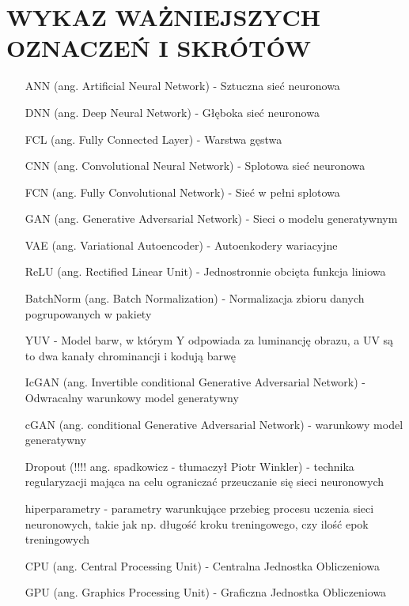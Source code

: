 \section*{WYKAZ WAŻNIEJSZYCH OZNACZEŃ I SKRÓTÓW}

  \bigskip

  \begin{itemize}
    \item[ANN] (ang. Artificial Neural Network) - Sztuczna sieć neuronowa
    \item[DNN] (ang. Deep Neural Network) - Głęboka sieć neuronowa
    \item[FCL] (ang. Fully Connected Layer) - Warstwa gęstwa
    \item[CNN] (ang. Convolutional Neural Network) - Splotowa sieć neuronowa
    \item[FCN] (ang. Fully Convolutional Network) - Sieć w pełni splotowa
    \item[GAN] (ang. Generative Adversarial Network) - Sieci o modelu generatywnym
    \item[VAE] (ang. Variational Autoencoder) - Autoenkodery wariacyjne
    \item[ReLU] (ang. Rectified Linear Unit) - Jednostronnie obcięta funkcja liniowa
    \item[BatchNorm] (ang. Batch Normalization) - Normalizacja zbioru danych
    pogrupowanych w pakiety
    \item[YUV] - Model barw, w którym Y odpowiada za luminancję obrazu, a UV
    są to dwa kanały chrominancji i kodują barwę
    \item[IcGAN] (ang. Invertible conditional Generative Adversarial Network) -
    Odwracalny warunkowy model generatywny
    \item[cGAN] (ang. conditional Generative Adversarial Network) - warunkowy
    model generatywny
    \item[Dropout] (!!!! ang. spadkowicz - tłumaczył Piotr Winkler) - technika
    regularyzacji mająca na celu ograniczać przeuczanie się sieci neuronowych
    \item[hiperparametry] - parametry warunkujące przebieg procesu uczenia sieci neuronowych,
    takie jak np. długość kroku treningowego, czy ilość epok treningowych
    \item[CPU] (ang. Central Processing Unit) - Centralna Jednostka Obliczeniowa
    \item[GPU] (ang. Graphics Processing Unit) - Graficzna Jednostka Obliczeniowa

\end{itemize}
